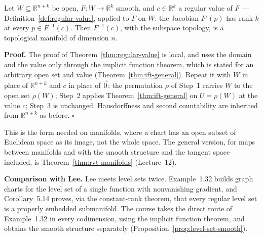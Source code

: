 \documentclass[11pt]{report}
\makeatletter
\newcounter{thmcounter}[section]
\renewenvironment{proof}[1][Proof]{\noindent\textbf{#1.} }{\hfill$\square$\par\vspace{5pt}}
\newcommand{\thmlabel}[1]{\edef\@currentlabel{\arabic{section}.\arabic{thmcounter}}\label{#1}}
\makeatother
\begin{document}
\begin{corbox}\thmlabel{cor:rvt-open}
Let $W \subseteq \mathbb{R}^{n+k}$ be open, $F : W \to \mathbb{R}^k$ smooth, and $c \in \mathbb{R}^k$ a regular value of $F$ --- Definition~\ref{def:regular-value}, applied to $F$ on $W$: the Jacobian $F'(p)$ has rank $k$ at every $p \in F^{-1}(c)$. Then $F^{-1}(c)$, with the subspace topology, is a topological manifold of dimension $n$.
\end{corbox}

\begin{proof}
The proof of Theorem~\ref{thm:regular-value} is local, and uses the domain and the value only through the implicit function theorem, which is stated for an arbitrary open set and value (Theorem~\ref{thm:ift-general}). Repeat it with $W$ in place of $\mathbb{R}^{n+k}$ and $c$ in place of $\vec 0$: the permutation $\rho$ of Step~1 carries $W$ to the open set $\rho(W)$; Step~2 applies Theorem~\ref{thm:ift-general} on $U = \rho(W)$ at the value $c$; Step~3 is unchanged. Hausdorffness and second countability are inherited from $\mathbb{R}^{n+k}$ as before.
\end{proof}

This is the form needed on manifolds, where a chart has an open subset of Euclidean space as its image, not the whole space. The general version, for maps between manifolds and with the smooth structure and the tangent space included, is Theorem~\ref{thm:rvt-manifolds} (Lecture~12).

\textbf{Comparison with Lee.} Lee meets level sets twice. Example~1.32 builds graph charts for the level set of a single function with nonvanishing gradient, and Corollary~5.14 proves, via the constant-rank theorem, that every regular level set is a properly embedded submanifold. The course takes the direct route of Example~1.32 in every codimension, using the implicit function theorem, and obtains the smooth structure separately (Proposition~\ref{prop:level-set-smooth}).
\end{document}
